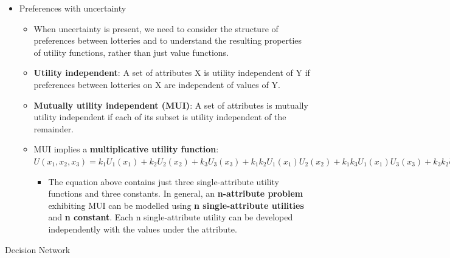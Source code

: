 \documentclass[12pt]{article}
\begin{document}
\begin{tcolorbox}
\begin{itemize}
\item Preferences with uncertainty
\begin{itemize}
\item When uncertainty is present, we need to consider the structure of preferences between lotteries and to understand the resulting properties of utility functions, rather than just value functions. 
\item \textbf{Utility independent}: A set of attributes X is utility independent of Y if preferences between lotteries on X are independent of values of Y.
\item \textbf{Mutually utility independent (MUI)}: A set of attributes is mutually utility independent if each of its subset is utility independent of the remainder.
\item MUI implies a \textbf{multiplicative utility function}: $U(x_1, x_2, x_3) = k_1U_1(x_1) + k_2U_2(x_2) + k_3U_3(x_3) + k_1k_2U_1(x_1)U_2(x_2) + k_1k_3U_1(x_1)U_3(x_3) + k_3k_2U_3(x_3)U_2(x_2) + k_1k_2k_3U_1(x_1)U_2(x_2)U_3(x_3)$
\begin{itemize}
\item The equation above contains just three single-attribute utility functions and three constants. In general, an \textbf{n-attribute problem} exhibiting MUI can be modelled using \textbf{n single-attribute utilities} and \textbf{n constant}. Each n single-attribute utility can be developed independently with the values under the attribute. 
\end{itemize}
\end{itemize}
\end{itemize}
\end{tcolorbox}

\pagebreak
\noindent
{\large{Decision Network}}
\end{document}
